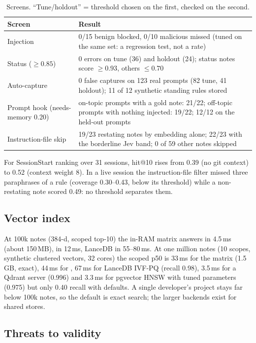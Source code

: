 \begin{table}[h]
\caption{Screens. ``Tune/holdout'' = threshold chosen on the first, checked on the second.}
\label{tab:screens}
\small
\begin{tabular}{@{}p{2.1cm}p{5.1cm}@{}}
\toprule
Screen & Result \\
\midrule
Injection & 0/15 benign blocked, 0/10 malicious missed (tuned on the same set: a regression test, not a rate) \\
Status ($\ge 0.85$) & 0 errors on tune (36) and holdout (24); status notes score $\ge 0.93$, others $\le 0.70$ \\
Auto-capture & 0 false captures on 123 real prompts (82 tune, 41 holdout); 11 of 12 synthetic standing rules stored \\
Prompt hook (needs-memory 0.20) & on-topic prompts with a gold note: 21/22; off-topic prompts with nothing injected: 19/22; 12/12 on the held-out prompts \\
Instruction-file skip & 19/23 restating notes by embedding alone; 22/23 with the borderline Jev band; 0 of 59 other notes skipped \\
\bottomrule
\end{tabular}
\end{table}

For SessionStart ranking over 31 sessions, hit@10 rises from 0.39 (no git context) to 0.52 (context weight 8). In a live session the instruction-file filter missed three paraphrases of a rule (coverage 0.30--0.43, below its threshold) while a non-restating note scored 0.49: no threshold separates them.

\subsection{Vector index}

At 100k notes (384-d, scoped top-10) the in-RAM matrix answers in 4.5\,ms (about 150\,MB),  in 12\,ms, LanceDB in 55--80\,ms. At one million notes (10 scopes, synthetic clustered vectors, 32 cores) the scoped p50 is 33\,ms for the matrix (1.5\,GB, exact), 44\,ms for , 67\,ms for LanceDB IVF-PQ (recall 0.98), 3.5\,ms for a Qdrant server (0.996) and 3.3\,ms for pgvector HNSW with tuned parameters (0.975) but only 0.40 recall with defaults. A single developer's project stays far below 100k notes, so the default is exact search; the larger backends exist for shared stores.

\subsection{Threats to validity}

